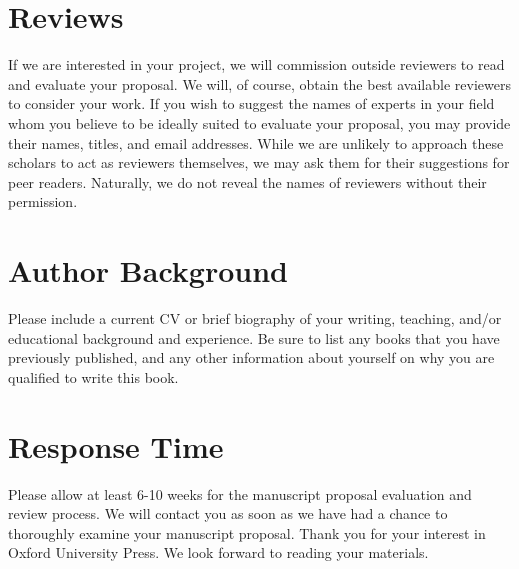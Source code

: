 \documentclass[
  10pt,
  dvipsnames,enabledeprecatedfontcommands]{scrartcl}
\begin{document}
\hypertarget{reviews}{%
\section{Reviews}\label{reviews}}

If we are interested in your project, we will commission outside
reviewers to read and evaluate your proposal. We will, of course, obtain
the best available reviewers to consider your work. If you wish to
suggest the names of experts in your field whom you believe to be
ideally suited to evaluate your proposal, you may provide their names,
titles, and email addresses. While we are unlikely to approach these
scholars to act as reviewers themselves, we may ask them for their
suggestions for peer readers. Naturally, we do not reveal the names of
reviewers without their permission.

\hypertarget{author-background}{%
\section{Author Background}\label{author-background}}

Please include a current CV or brief biography of your writing,
teaching, and/or educational background and experience. Be sure to list
any books that you have previously published, and any other information
about yourself on why you are qualified to write this book.

\hypertarget{response-time}{%
\section{Response Time}\label{response-time}}

Please allow at least 6-10 weeks for the manuscript proposal evaluation
and review process. We will contact you as soon as we have had a chance
to thoroughly examine your manuscript proposal. Thank you for your
interest in Oxford University Press. We look forward to reading your
materials.
\end{document}
